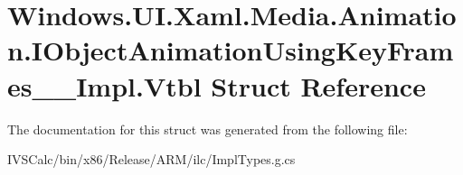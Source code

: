 \hypertarget{struct_windows_1_1_u_i_1_1_xaml_1_1_media_1_1_animation_1_1_i_object_animation_using_key_frames_____impl_1_1_vtbl}{}\section{Windows.\+U\+I.\+Xaml.\+Media.\+Animation.\+I\+Object\+Animation\+Using\+Key\+Frames\+\_\+\+\_\+\+Impl.\+Vtbl Struct Reference}
\label{struct_windows_1_1_u_i_1_1_xaml_1_1_media_1_1_animation_1_1_i_object_animation_using_key_frames_____impl_1_1_vtbl}


The documentation for this struct was generated from the following file\+:\begin{DoxyCompactItemize}
\item 
I\+V\+S\+Calc/bin/x86/\+Release/\+A\+R\+M/ilc/Impl\+Types.\+g.\+cs\end{DoxyCompactItemize}
